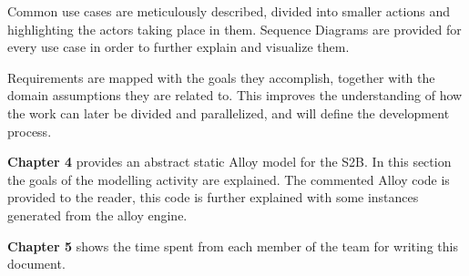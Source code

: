 Common use cases are meticulously described, divided into smaller actions and highlighting the actors taking place in them. Sequence Diagrams are provided for every use case in order to further explain and visualize them.

Requirements are mapped with the goals they accomplish, together with the domain assumptions they are related to. This improves the understanding of how the work can later be divided and parallelized, and will define the development process.


\textbf{Chapter 4} provides an abstract static Alloy model for the S2B. In this section the goals of the modelling activity are explained. The commented Alloy code is provided to the reader, this code is further explained with some instances generated from the alloy engine.

\textbf{Chapter 5} shows the time spent from each member of the team for writing this document.